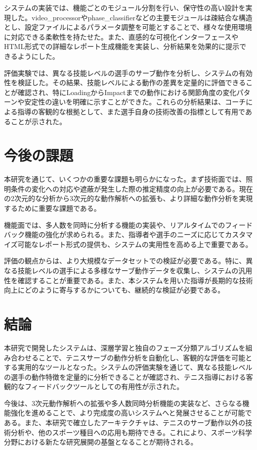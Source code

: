 \documentclass[oneside]{suribt}[11pt]
\begin{document}
システムの実装では、機能ごとのモジュール分割を行い、保守性の高い設計を実現した。video\_processorやphase\_classifierなどの主要モジュールは疎結合な構造とし、設定ファイルによるパラメータ調整を可能とすることで、様々な使用環境に対応できる柔軟性を持たせた。また、直感的な可視化インターフェースやHTML形式での詳細なレポート生成機能を実装し、分析結果を効果的に提示できるようにした。

評価実験では、異なる技能レベルの選手のサーブ動作を分析し、システムの有効性を検証した。その結果、技能レベルによる動作の差異を定量的に評価できることが確認され、特にLoadingからImpactまでの動作における関節角度の変化パターンや安定性の違いを明確に示すことができた。これらの分析結果は、コーチによる指導の客観的な根拠として、また選手自身の技術改善の指標として有用であることが示された。

\section{今後の課題}

本研究を通じて、いくつかの重要な課題も明らかになった。まず技術面では、照明条件の変化への対応や遮蔽が発生した際の推定精度の向上が必要である。現在の2次元的な分析から3次元的な動作解析への拡張も、より詳細な動作分析を実現するために重要な課題である。

機能面では、多人数を同時に分析する機能の実装や、リアルタイムでのフィードバック機能の強化が求められる。また、指導者や選手のニーズに応じてカスタマイズ可能なレポート形式の提供も、システムの実用性を高める上で重要である。

評価の観点からは、より大規模なデータセットでの検証が必要である。特に、異なる技能レベルの選手による多様なサーブ動作データを収集し、システムの汎用性を確認することが重要である。また、本システムを用いた指導が長期的な技術向上にどのように寄与するかについても、継続的な検証が必要である。

\section{結論}

本研究で開発したシステムは、深層学習と独自のフェーズ分類アルゴリズムを組み合わせることで、テニスサーブの動作分析を自動化し、客観的な評価を可能とする実用的なツールとなった。システムの評価実験を通じて、異なる技能レベルの選手の動作特徴を定量的に分析できることが確認され、テニス指導における客観的なフィードバックツールとしての有用性が示された。

今後は、3次元動作解析への拡張や多人数同時分析機能の実装など、さらなる機能強化を進めることで、より完成度の高いシステムへと発展させることが可能である。また、本研究で確立したアーキテクチャは、テニスのサーブ動作以外の技術分析や、他のスポーツ種目への応用も期待できる。これにより、スポーツ科学分野における新たな研究展開の基盤となることが期待される。
\end{document}
